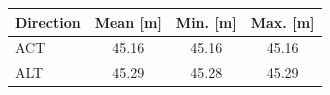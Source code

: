 \begin{tabular}{lccc}
\toprule
Direction & Mean [m] & Min. [m] & Max. [m] \\
\midrule
ACT & 45.16 & 45.16 & 45.16 \\
ALT & 45.29 & 45.28 & 45.29 \\
\bottomrule
\end{tabular}
